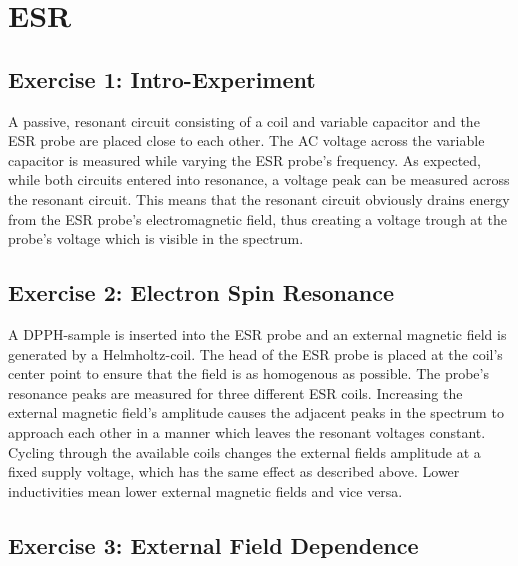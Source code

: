 \chapter{ESR}

\section{Exercise 1: Intro-Experiment}
A passive, resonant circuit consisting of a coil and variable capacitor and the ESR probe are placed close to each other.
The AC voltage across the variable capacitor is measured while varying the ESR probe's frequency.
As expected, while both circuits entered into resonance, a voltage peak can be measured across the resonant circuit.
This means that the resonant circuit obviously drains energy from the ESR probe's electromagnetic field, thus creating a voltage trough at the probe's voltage which is visible in the spectrum.

\section{Exercise 2: Electron Spin Resonance}
A DPPH-sample is inserted into the ESR probe and an external magnetic field is generated by a Helmholtz-coil.
The head of the ESR probe is placed at the coil's center point to ensure that the field is as homogenous as possible.
The probe's resonance peaks are measured for three different ESR coils.
Increasing the external magnetic field's amplitude causes the adjacent peaks in the spectrum to approach each other in a manner which leaves the resonant voltages constant.
Cycling through the available coils changes the external fields amplitude at a fixed supply voltage, which has the same effect as described above.
Lower inductivities mean lower external magnetic fields and vice versa.

\section{Exercise 3: External Field Dependence}
